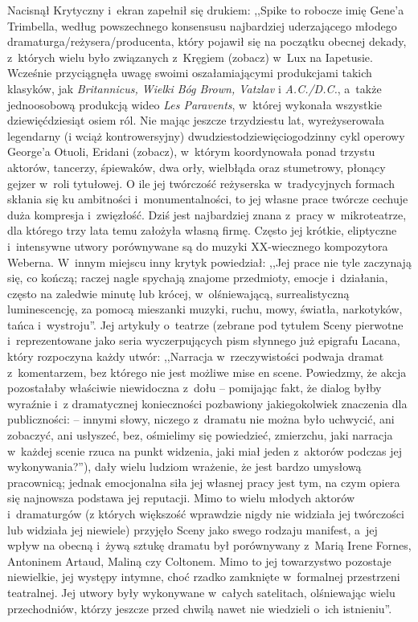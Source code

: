 \documentclass[oneside,polish,11pt,rmheadings]{mwbk}
\begin{document}
Nacisnął Krytyczny i~ekran zapełnił się drukiem:  ,,Spike to robocze imię Gene'a Trimbella, według powszechnego konsensusu najbardziej uderzającego młodego dramaturga/reżysera/producenta, który pojawił się na początku obecnej dekady, z~których wielu było związanych z~Kręgiem (zobacz) w~Lux na Iapetusie. Wcześnie przyciągnęła uwagę swoimi oszałamiającymi produkcjami takich klasyków, jak \textit{Britannicus, Wielki Bóg Brown, Vatzlav }i \textit{A.C./D.C.}, a~także jednoosobową produkcją wideo \textit{Les Paravents}, w~której wykonała wszystkie dziewięćdziesiąt osiem ról. Nie mając jeszcze trzydziestu lat, wyreżyserowała legendarny (i wciąż kontrowersyjny) dwudziestodziewięciogodzinny cykl operowy George'a Otuoli, Eridani (zobacz), w~którym koordynowała ponad trzystu aktorów, tancerzy, śpiewaków, dwa orły, wielbłąda oraz stumetrowy, płonący gejzer w~roli tytułowej. O ile jej twórczość reżyserska w~tradycyjnych formach skłania się ku ambitności i~monumentalności, to jej własne prace twórcze cechuje duża kompresja i~zwięzłość. Dziś jest najbardziej znana z~pracy w~mikroteatrze, dla którego trzy lata temu założyła własną firmę. Często jej krótkie, eliptyczne i~intensywne utwory porównywane są do muzyki XX-wiecznego kompozytora Weberna. W~innym miejscu inny krytyk powiedział: ,,Jej prace nie tyle zaczynają się, co kończą; raczej nagle spychają znajome przedmioty, emocje i~działania, często na zaledwie minutę lub krócej, w~olśniewającą, surrealistyczną luminescencję, za pomocą mieszanki muzyki, ruchu, mowy, światła, narkotyków, tańca i~wystroju''. Jej artykuły o~teatrze (zebrane pod tytułem Sceny pierwotne i~reprezentowane jako seria wyczerpujących pism słynnego już epigrafu Lacana, który rozpoczyna każdy utwór: ,,Narracja w~rzeczywistości podwaja dramat z~komentarzem, bez którego nie jest możliwe mise en scene. Powiedzmy, że akcja pozostałaby właściwie niewidoczna z~dołu -- pomijając fakt, że dialog byłby wyraźnie i~z dramatycznej konieczności pozbawiony jakiegokolwiek znaczenia dla publiczności: -- innymi słowy, niczego z~dramatu nie można było uchwycić, ani zobaczyć, ani usłyszeć, bez, ośmielimy się powiedzieć, zmierzchu, jaki narracja w~każdej scenie rzuca na punkt widzenia, jaki miał jeden z~aktorów podczas jej wykonywania?''), dały wielu ludziom wrażenie, że jest bardzo umysłową pracownicą; jednak emocjonalna siła jej własnej pracy jest tym, na czym opiera się najnowsza podstawa jej reputacji. Mimo to wielu młodych aktorów i~dramaturgów (z których większość wprawdzie nigdy nie widziała jej twórczości lub widziała jej niewiele) przyjęło Sceny jako swego rodzaju manifest, a~jej wpływ na obecną i~żywą sztukę dramatu był porównywany z~Marią Irene Fornes, Antoninem Artaud, Maliną czy Coltonem. Mimo to jej towarzystwo pozostaje niewielkie, jej występy intymne, choć rzadko zamknięte w~formalnej przestrzeni teatralnej. Jej utwory były wykonywane w~całych satelitach, olśniewając wielu przechodniów, którzy jeszcze przed chwilą nawet nie wiedzieli o~ich istnieniu''. 
\end{document}

